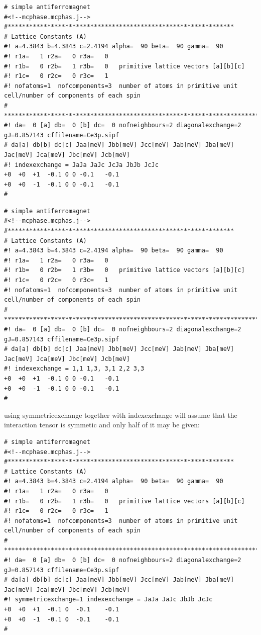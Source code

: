 {\small
\begin{verbatim} 
# simple antiferromagnet 
#<!--mcphase.mcphas.j-->
#***************************************************************
# Lattice Constants (A)
#! a=4.3843 b=4.3843 c=2.4194 alpha=  90 beta=  90 gamma=  90
#! r1a=   1 r2a=   0 r3a=   0
#! r1b=   0 r2b=   1 r3b=   0   primitive lattice vectors [a][b][c]
#! r1c=   0 r2c=   0 r3c=   1
#! nofatoms=1  nofcomponents=3  number of atoms in primitive unit cell/number of components of each spin
# ****************************************************************************
#! da=  0 [a] db=  0 [b] dc=  0 nofneighbours=2 diagonalexchange=2 gJ=0.857143 cffilename=Ce3p.sipf
# da[a] db[b] dc[c] Jaa[meV] Jbb[meV] Jcc[meV] Jab[meV] Jba[meV] Jac[meV] Jca[meV] Jbc[meV] Jcb[meV]
#! indexexchange = JaJa JaJc JcJa JbJb JcJc
+0	+0	+1	-0.1 0 0 -0.1	-0.1  
+0	+0	-1	-0.1 0 0 -0.1	-0.1  
#\end{verbatim}
}

{\small
\begin{verbatim} 
# simple antiferromagnet 
#<!--mcphase.mcphas.j-->
#***************************************************************
# Lattice Constants (A)
#! a=4.3843 b=4.3843 c=2.4194 alpha=  90 beta=  90 gamma=  90
#! r1a=   1 r2a=   0 r3a=   0
#! r1b=   0 r2b=   1 r3b=   0   primitive lattice vectors [a][b][c]
#! r1c=   0 r2c=   0 r3c=   1
#! nofatoms=1  nofcomponents=3  number of atoms in primitive unit cell/number of components of each spin
# ****************************************************************************
#! da=  0 [a] db=  0 [b] dc=  0 nofneighbours=2 diagonalexchange=2 gJ=0.857143 cffilename=Ce3p.sipf
# da[a] db[b] dc[c] Jaa[meV] Jbb[meV] Jcc[meV] Jab[meV] Jba[meV] Jac[meV] Jca[meV] Jbc[meV] Jcb[meV]
#! indexexchange = 1,1 1,3, 3,1 2,2 3,3
+0	+0	+1	-0.1 0 0 -0.1	-0.1  
+0	+0	-1	-0.1 0 0 -0.1	-0.1  
#\end{verbatim}
}


using symmetricexchange together with indexexchange will assume that the interaction tensor is symmetic and 
only half of it may be given:

{\small
\begin{verbatim} 
# simple antiferromagnet 
#<!--mcphase.mcphas.j-->
#***************************************************************
# Lattice Constants (A)
#! a=4.3843 b=4.3843 c=2.4194 alpha=  90 beta=  90 gamma=  90
#! r1a=   1 r2a=   0 r3a=   0
#! r1b=   0 r2b=   1 r3b=   0   primitive lattice vectors [a][b][c]
#! r1c=   0 r2c=   0 r3c=   1
#! nofatoms=1  nofcomponents=3  number of atoms in primitive unit cell/number of components of each spin
# ****************************************************************************
#! da=  0 [a] db=  0 [b] dc=  0 nofneighbours=2 diagonalexchange=2 gJ=0.857143 cffilename=Ce3p.sipf
# da[a] db[b] dc[c] Jaa[meV] Jbb[meV] Jcc[meV] Jab[meV] Jba[meV] Jac[meV] Jca[meV] Jbc[meV] Jcb[meV]
#! symmetricexchange=1 indexexchange = JaJa JaJc JbJb JcJc
+0	+0	+1	-0.1 0  -0.1	-0.1  
+0	+0	-1	-0.1 0  -0.1	-0.1  
#\end{verbatim}
}


